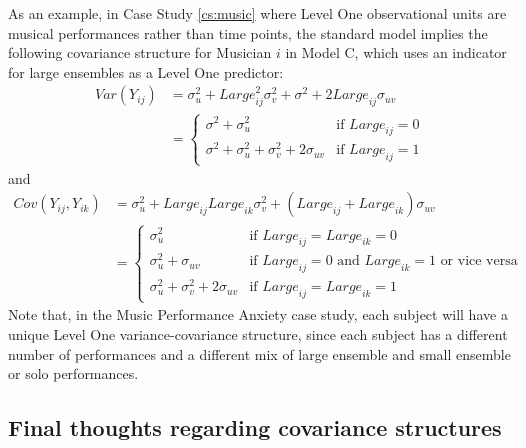 \documentclass[
]{krantz}
\begin{document}
As an example, in Case Study \ref{cs:music} where Level One observational units are musical performances rather than time points, the standard model implies the following covariance structure for Musician \(i\) in Model C, which uses an indicator for large ensembles as a Level One predictor:
\begin{align*}
Var(Y_{ij}) & = \sigma_{u}^{2} + \textstyle{Large}^{2}_{ij} \sigma_{v}^{2} + \sigma^{2} + 2\textstyle{Large}_{ij}\sigma_{uv} \\
 & = \left\{ \begin{array}{ll}
                 \sigma^{2} + \sigma_{u}^{2} & \mbox{if $\textstyle{Large}_{ij}=0$} \\
                 \sigma^{2} + \sigma_{u}^{2} + \sigma_{v}^{2} + 2\sigma_{uv} & \mbox{if $\textstyle{Large}_{ij}=1$}
               \end{array}
       \right.
\end{align*}
\noindent and
\begin{align*}
Cov(Y_{ij},Y_{ik}) & = \sigma_{u}^{2} + \textstyle{Large}_{ij}\textstyle{Large}_{ik} \sigma_{v}^{2} + (\textstyle{Large}_{ij} + 
  \textstyle{Large}_{ik}) \sigma_{uv} \\
 & = \left\{ \begin{array}{ll}
                 \sigma_{u}^{2} & \mbox{if $\textstyle{Large}_{ij}=\textstyle{Large}_{ik}=0$} \\
                 \sigma_{u}^{2} + \sigma_{uv} & \mbox{if $\textstyle{Large}_{ij}=0$ and $\textstyle{Large}_{ik}=1$ or vice versa} \\
                 \sigma_{u}^{2} + \sigma_{v}^{2} + 2\sigma_{uv} & \mbox{if $\textstyle{Large}_{ij}=\textstyle{Large}_{ik}=1$}
               \end{array}
       \right.
\end{align*}
Note that, in the Music Performance Anxiety case study, each subject will have a unique Level One variance-covariance structure, since each subject has a different number of performances and a different mix of large ensemble and small ensemble or solo performances.

\hypertarget{final-thoughts-regarding-covariance-structures}{%
\subsection{Final thoughts regarding covariance structures}\label{final-thoughts-regarding-covariance-structures}}
\end{document}
